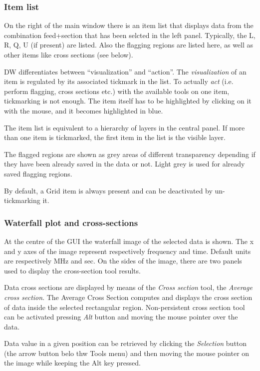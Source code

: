 \documentclass[letterpaper,10pt,english]{sphinxmanual}
\begin{document}
\subsubsection{Item list}
\label{gui:item-list}
On the right of the main window there is an item list that displays data from the combination
feed+section that has been selcted in the left panel. Typically, the L, R, Q, U (if
present) are listed. Also the flagging regions are listed here, as well as other items
like cross sections (see below).

DW differentiates between ``visualization'' and ``action''.
The \emph{visualization} of an item is regulated by its
associated tickmark in the list. To actually \emph{act} (i.e. perform flagging, cross sections etc.)
with the available tools on one item, tickmarking is not enough. The item itself has to be
highlighted by clicking on it with the mouse, and it becomes highlighted in blue.

The item list is equivalent to a hierarchy of layers in the central panel. If more than one
item is tickmarked, the first item in the list is the visible layer.

The flagged regions are shown as grey areas of different transparency depending if they have
been already
saved in the data or not. Light grey is used for already saved flagging regions.

By default, a Grid item is always present and can be deactivated by un-tickmarking it.


\subsubsection{Waterfall plot and cross-sections}
\label{gui:waterfall-plot-and-cross-sections}
At the centre of the GUI the waterfall image of the selected data is shown. The x and y axes
of the image represent respectively frequency and time. Default units are respectively MHz and
sec.
On the sides of the image, there are two panels used to display the cross-section tool results.

Data cross sections are displayed by means of the \emph{Cross section} tool, the \emph{Average cross
section}. The Average Cross Section computes and displays the cross section of data inside
the selected rectangular region.
Non-persistent cross section tool can be activated pressing \emph{Alt} button and moving the
mouse pointer over the data.

Data value in a given position can be retrieved by clicking the \emph{Selection} button
(the arrow button belo thw Tools menu) and then moving the mouse pointer on the image while
keeping the Alt key pressed.
\end{document}
